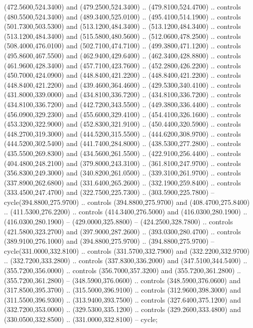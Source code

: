 {{{{{            (472.5600,524.3400) and (479.2500,524.3400) .. (479.8100,524.4700) .. controls
            (480.5500,524.3400) and (489.3400,525.0100) .. (495.4100,514.1900) .. controls
            (501.7300,503.5300) and (513.1200,484.3400) .. (513.1200,484.3400) .. controls
            (513.1200,484.3400) and (515.5800,480.5600) .. (512.0600,478.2500) .. controls
            (508.4000,476.0100) and (502.7100,474.7100) .. (499.3800,471.1200) .. controls
            (495.8600,467.5500) and (462.9400,429.6400) .. (462.3400,428.8800) .. controls
            (461.9600,428.3400) and (457.7100,423.7600) .. (452.2800,426.2200) .. controls
            (450.7000,424.0900) and (448.8400,421.2200) .. (448.8400,421.2200) .. controls
            (448.8400,421.2200) and (439.4600,364.4600) .. (429.5300,340.4100) .. controls
            (431.8000,339.0000) and (434.8100,336.7200) .. (434.8100,336.7200) .. controls
            (434.8100,336.7200) and (442.7200,343.5500) .. (449.3800,336.4400) .. controls
            (456.0900,329.2300) and (455.6000,329.4100) .. (454.4100,326.1600) .. controls
            (453.3200,322.9000) and (452.8300,321.9100) .. (450.4400,320.5900) .. controls
            (448.2700,319.3000) and (444.5200,315.5500) .. (444.6200,308.9700) .. controls
            (444.5200,302.5400) and (441.7400,284.8000) .. (438.5300,277.2800) .. controls
            (435.5500,269.8300) and (434.5600,261.5500) .. (422.9100,256.4400) .. controls
            (404.4800,248.2100) and (379.8000,243.3100) .. (361.8100,247.9700) .. controls
            (356.8300,249.3000) and (340.8200,261.0500) .. (339.3100,261.9700) .. controls
            (337.8900,262.6800) and (331.6400,265.2600) .. (332.1900,259.8400) .. controls
            (333.4500,247.4700) and (322.7500,225.7300) .. (303.5900,225.7800) --
            cycle(394.8800,275.9700) .. controls (394.8800,275.9700) and
            (408.4700,275.8400) .. (411.5300,276.2200) .. controls (414.3400,276.5000) and
            (416.0300,280.1900) .. (416.0300,280.1900) -- (429.0000,325.8800) --
            (424.2500,328.7800) .. controls (421.5800,323.2700) and (397.9000,287.2600) ..
            (393.0300,280.4700) .. controls (389.9100,276.1000) and (394.8800,275.9700) ..
            (394.8800,275.9700) -- cycle(331.0000,332.8100) .. controls
            (331.5700,332.7900) and (332.2200,332.9700) .. (332.7200,333.2800) .. controls
            (337.8300,336.2000) and (347.5100,344.5400) .. (355.7200,356.0000) .. controls
            (356.7000,357.3200) and (355.7200,361.2800) .. (355.7200,361.2800) --
            (348.5900,376.0600) .. controls (348.5900,376.0600) and (317.8500,395.3700) ..
            (315.5000,396.9100) .. controls (312.9600,398.3000) and (311.5500,396.9300) ..
            (313.9400,393.7500) .. controls (327.6400,375.1200) and (332.7200,353.0000) ..
            (329.5300,335.1200) .. controls (329.2600,333.4800) and (330.0500,332.8500) ..
            (331.0000,332.8100) -- cycle;
        }%
      }%
    }%
  }%
}

